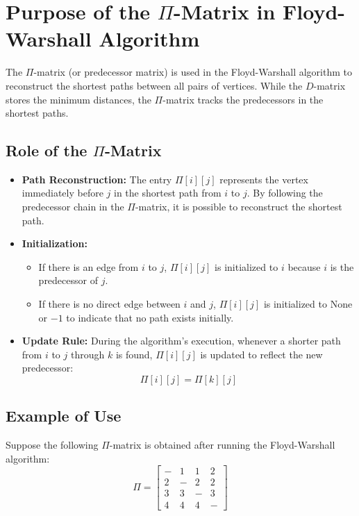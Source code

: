 \section{Purpose of the \( \Pi \)-Matrix in Floyd-Warshall Algorithm}

The \( \Pi \)-matrix (or predecessor matrix) is used in the Floyd-Warshall algorithm to reconstruct the shortest paths between all pairs of vertices. While the \( D \)-matrix stores the minimum distances, the \( \Pi \)-matrix tracks the predecessors in the shortest paths.

\subsection{Role of the \( \Pi \)-Matrix}
\begin{itemize}
    \item \textbf{Path Reconstruction:}
    The entry \( \Pi[i][j] \) represents the vertex immediately before \( j \) in the shortest path from \( i \) to \( j \). By following the predecessor chain in the \( \Pi \)-matrix, it is possible to reconstruct the shortest path.

    \item \textbf{Initialization:}
    \begin{itemize}
        \item If there is an edge from \( i \) to \( j \), \( \Pi[i][j] \) is initialized to \( i \) because \( i \) is the predecessor of \( j \).
        \item If there is no direct edge between \( i \) and \( j \), \( \Pi[i][j] \) is initialized to \( \text{None} \) or \( -1 \) to indicate that no path exists initially.
    \end{itemize}

    \item \textbf{Update Rule:}
    During the algorithm's execution, whenever a shorter path from \( i \) to \( j \) through \( k \) is found, \( \Pi[i][j] \) is updated to reflect the new predecessor:
    \[
    \Pi[i][j] = \Pi[k][j]
    \]
\end{itemize}

\subsection{Example of Use}
Suppose the following \( \Pi \)-matrix is obtained after running the Floyd-Warshall algorithm:
\[
\Pi = 
\begin{bmatrix}
- & 1 & 1 & 2 \\
2 & - & 2 & 2 \\
3 & 3 & - & 3 \\
4 & 4 & 4 & -
\end{bmatrix}
\]


